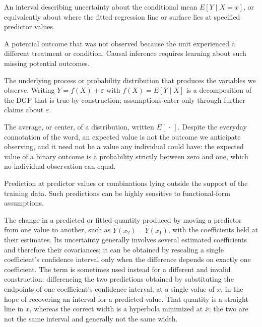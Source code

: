 \documentclass[11pt]{report}
\begin{document}
\begin{description}[style=nextline,leftmargin=0pt,labelindent=0pt,font=\bfseries]
\item[Confidence interval for a predicted mean] An interval describing uncertainty about the conditional mean \(E[Y\mid X=x]\), or equivalently about where the fitted regression line or surface lies at specified predictor values.

\item[Counterfactual] A potential outcome that was not observed because the unit experienced a different treatment or condition. Causal inference requires learning about such missing potential outcomes.

\item[Data-generating process (DGP)] The underlying process or probability distribution that produces the variables we observe. Writing \(Y=f(X)+\varepsilon\) with \(f(X)=E[Y\mid X]\) is a decomposition of the DGP that is true by construction; assumptions enter only through further claims about \(\varepsilon\).

\item[Expected value] The average, or center, of a distribution, written \(E[\,\cdot\,]\). Despite the everyday connotation of the word, an expected value is not the outcome we anticipate observing, and it need not be a value any individual could have: the expected value of a binary outcome is a probability strictly between zero and one, which no individual observation can equal.

\item[Extrapolation] Prediction at predictor values or combinations lying outside the support of the training data. Such predictions can be highly sensitive to functional-form assumptions.

\item[First difference] The change in a predicted or fitted quantity produced by moving a predictor from one value to another, such as \(\widehat{Y}(x_2)-\widehat{Y}(x_1)\), with the coefficients held at their estimates. Its uncertainty generally involves several estimated coefficients and therefore their covariances; it can be obtained by rescaling a single coefficient's confidence interval only when the difference depends on exactly one coefficient. The term is sometimes used instead for a different and invalid construction: differencing the two predictions obtained by substituting the endpoints of one coefficient's confidence interval, at a single value of \(x\), in the hope of recovering an interval for a predicted value. That quantity is a straight line in \(x\), whereas the correct width is a hyperbola minimized at \(\overline{x}\); the two are not the same interval and generally not the same width.


\end{description}
\end{document}
